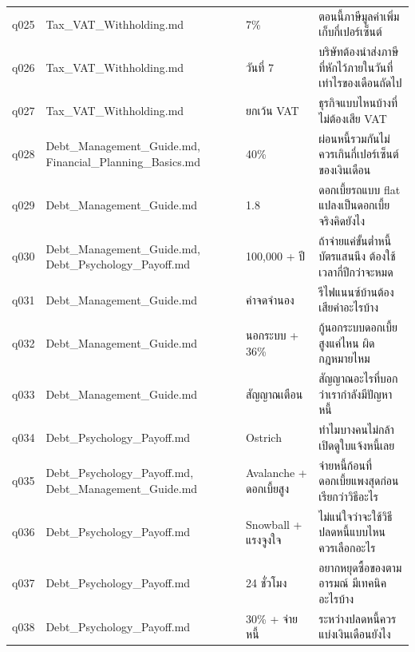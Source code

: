 \documentclass[11pt,a4paper]{article}
\begin{document}
{\begin{longtable}{lp{3.6cm}p{3.4cm}p{6.3cm}}
q025 & Tax\_\allowbreak{}VAT\_\allowbreak{}Withholding.md & 7\% & {\thaifont ตอนนี้ภาษีมูลค่าเพิ่มเก็บกี่เปอร์เซ็นต์} \\
q026 & Tax\_\allowbreak{}VAT\_\allowbreak{}Withholding.md & {\thaifont วันที่ }7 & {\thaifont บริษัทต้องนำส่งภาษีที่หักไว้ภายในวันที่เท่าไรของเดือนถัดไป} \\
q027 & Tax\_\allowbreak{}VAT\_\allowbreak{}Withholding.md & {\thaifont ยกเว้น }VAT & {\thaifont ธุรกิจแบบไหนบ้างที่ไม่ต้องเสีย }VAT \\
q028 & Debt\_\allowbreak{}Management\_\allowbreak{}Guide.md, Financial\_\allowbreak{}Planning\_\allowbreak{}Basics.md & 40\% & {\thaifont ผ่อนหนี้รวมกันไม่ควรเกินกี่เปอร์เซ็นต์ของเงินเดือน} \\
q029 & Debt\_\allowbreak{}Management\_\allowbreak{}Guide.md & 1.8 & {\thaifont ดอกเบี้ยรถแบบ }flat {\thaifont แปลงเป็นดอกเบี้ยจริงคิดยังไง} \\
q030 & Debt\_\allowbreak{}Management\_\allowbreak{}Guide.md, Debt\_\allowbreak{}Psychology\_\allowbreak{}Payoff.md & 100,000 + {\thaifont ปี} & {\thaifont ถ้าจ่ายแค่ขั้นต่ำหนี้บัตรแสนนึง ต้องใช้เวลากี่ปีกว่าจะหมด} \\
q031 & Debt\_\allowbreak{}Management\_\allowbreak{}Guide.md & {\thaifont ค่าจดจำนอง} & {\thaifont รีไฟแนนซ์บ้านต้องเสียค่าอะไรบ้าง} \\
q032 & Debt\_\allowbreak{}Management\_\allowbreak{}Guide.md & {\thaifont นอกระบบ }+ 36\% & {\thaifont กู้นอกระบบดอกเบี้ยสูงแค่ไหน ผิดกฎหมายไหม} \\
q033 & Debt\_\allowbreak{}Management\_\allowbreak{}Guide.md & {\thaifont สัญญาณเตือน} & {\thaifont สัญญาณอะไรที่บอกว่าเรากำลังมีปัญหาหนี้} \\
q034 & Debt\_\allowbreak{}Psychology\_\allowbreak{}Payoff.md & Ostrich & {\thaifont ทำไมบางคนไม่กล้าเปิดดูใบแจ้งหนี้เลย} \\
q035 & Debt\_\allowbreak{}Psychology\_\allowbreak{}Payoff.md, Debt\_\allowbreak{}Management\_\allowbreak{}Guide.md & Avalanche + {\thaifont ดอกเบี้ยสูง} & {\thaifont จ่ายหนี้ก้อนที่ดอกเบี้ยแพงสุดก่อนเรียกว่าวิธีอะไร} \\
q036 & Debt\_\allowbreak{}Psychology\_\allowbreak{}Payoff.md & Snowball + {\thaifont แรงจูงใจ} & {\thaifont ไม่แน่ใจว่าจะใช้วิธีปลดหนี้แบบไหน ควรเลือกอะไร} \\
q037 & Debt\_\allowbreak{}Psychology\_\allowbreak{}Payoff.md & 24 {\thaifont ชั่วโมง} & {\thaifont อยากหยุดซื้อของตามอารมณ์ มีเทคนิคอะไรบ้าง} \\
q038 & Debt\_\allowbreak{}Psychology\_\allowbreak{}Payoff.md & 30\% + {\thaifont จ่ายหนี้} & {\thaifont ระหว่างปลดหนี้ควรแบ่งเงินเดือนยังไง} \\

\end{longtable}}
\end{document}
